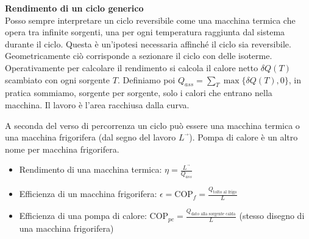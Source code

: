 \documentclass[10pt,a4paper]{article}
\newcommand{\Lusc}{{\ensuremath{L^{\vec{}}}}}
\begin{document}
\begin{multicols}{2}
\textbf{Rendimento di un ciclo generico} \\
Posso sempre interpretare un ciclo reversibile come una macchina termica che opera tra infinite sorgenti, una per ogni temperatura raggiunta dal sistema durante il ciclo. Questa è un'ipotesi necessaria affinché il ciclo sia reversibile. 
Geometricamente ciò corrisponde a sezionare il ciclo con delle isoterme. 
Operativamente per calcolare il rendimento si calcola il calore netto $\delta Q(T)$ scambiato con ogni sorgente $T$. Definiamo poi $Q_{ass}=\sum_T \max\{ \delta Q(T), 0 \}$, in pratica sommiamo, sorgente per sorgente, solo i calori che entrano nella macchina.
Il lavoro è l'area racchiusa dalla curva.
  
A seconda del verso di percorrenza un ciclo può essere una macchina termica o una macchina frigorifera (dal segno del lavoro $\Lusc$). Pompa di calore è un altro nome per macchina frigorifera.
  \begin{itemize}
  \item Rendimento di una macchina termica: $\eta = \frac{\Lusc}{Q_{ass}}$
  \item Efficienza di un macchina frigorifera: $\epsilon = \mbox{COP}_f= \frac{Q_{\mbox{tolto al frigo}}}{L}$
  \item Efficienza di una pompa di calore: $\mbox{COP}_{pc}= \frac{Q_{\mbox{dato alla sorgente calda}}}{L}$ (stesso disegno di una macchina frigorifera)
  \end{itemize}


\end{multicols}
\end{document}
